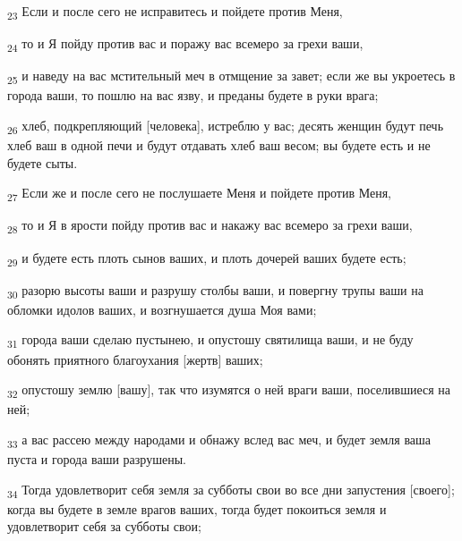 \begin{tcolorbox}
\textsubscript{23} Если и после сего не исправитесь и пойдете против Меня,
\end{tcolorbox}
\begin{tcolorbox}
\textsubscript{24} то и Я пойду против вас и поражу вас всемеро за грехи ваши,
\end{tcolorbox}
\begin{tcolorbox}
\textsubscript{25} и наведу на вас мстительный меч в отмщение за завет; если же вы укроетесь в города ваши, то пошлю на вас язву, и преданы будете в руки врага;
\end{tcolorbox}
\begin{tcolorbox}
\textsubscript{26} хлеб, подкрепляющий [человека], истреблю у вас; десять женщин будут печь хлеб ваш в одной печи и будут отдавать хлеб ваш весом; вы будете есть и не будете сыты.
\end{tcolorbox}
\begin{tcolorbox}
\textsubscript{27} Если же и после сего не послушаете Меня и пойдете против Меня,
\end{tcolorbox}
\begin{tcolorbox}
\textsubscript{28} то и Я в ярости пойду против вас и накажу вас всемеро за грехи ваши,
\end{tcolorbox}
\begin{tcolorbox}
\textsubscript{29} и будете есть плоть сынов ваших, и плоть дочерей ваших будете есть;
\end{tcolorbox}
\begin{tcolorbox}
\textsubscript{30} разорю высоты ваши и разрушу столбы ваши, и повергну трупы ваши на обломки идолов ваших, и возгнушается душа Моя вами;
\end{tcolorbox}
\begin{tcolorbox}
\textsubscript{31} города ваши сделаю пустынею, и опустошу святилища ваши, и не буду обонять приятного благоухания [жертв] ваших;
\end{tcolorbox}
\begin{tcolorbox}
\textsubscript{32} опустошу землю [вашу], так что изумятся о ней враги ваши, поселившиеся на ней;
\end{tcolorbox}
\begin{tcolorbox}
\textsubscript{33} а вас рассею между народами и обнажу вслед вас меч, и будет земля ваша пуста и города ваши разрушены.
\end{tcolorbox}
\begin{tcolorbox}
\textsubscript{34} Тогда удовлетворит себя земля за субботы свои во все дни запустения [своего]; когда вы будете в земле врагов ваших, тогда будет покоиться земля и удовлетворит себя за субботы свои;
\end{tcolorbox}
